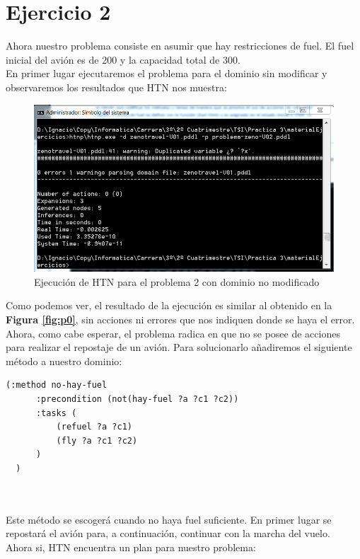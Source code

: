 \section{Ejercicio 2}

Ahora nuestro problema consiste en asumir que hay restricciones de fuel. El fuel inicial del avión es de 200 y la capacidad total de 300.\\

En primer lugar ejecutaremos el problema para el dominio sin modificar y observaremos los resultados que HTN nos muestra: 

\begin{figure}[H]
	\centering
	\includegraphics[width=0.7\linewidth]{p21}
	\caption{Ejecución de HTN para el problema 2 con dominio no modificado}
	\label{fig:p21}
\end{figure}

Como podemos ver, el resultado de la ejecución es similar al obtenido en la \textbf{Figura \ref{fig:p0}}, sin acciones ni errores que nos indiquen donde se haya el error.\\

Ahora, como cabe esperar, el problema radica en que no se posee de acciones para realizar el repostaje de un avión. Para solucionarlo añadiremos el siguiente método a nuestro dominio:

	\begin{lstlisting}[language=SH]
  (:method no-hay-fuel
	  :precondition (not(hay-fuel ?a ?c1 ?c2))
	  :tasks (
		  (refuel ?a ?c1)
		  (fly ?a ?c1 ?c2)
	  )
  )

	
	\end{lstlisting}

Este método se escogerá cuando no haya fuel suficiente. En primer lugar se repostará el avión para, a continuación, continuar con la marcha del vuelo.\\

Ahora si, HTN encuentra un plan para nuestro problema:\\

